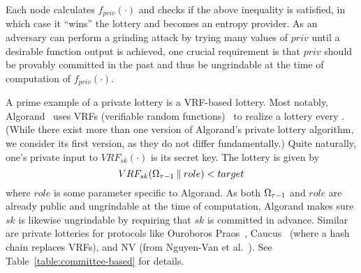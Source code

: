 Each node calculates $f_{priv}(\cdot)$ and checks if the above inequality is satisfied, in which case it ``wins'' the lottery and becomes an entropy provider. As an adversary can perform a grinding attack by trying many values of $priv$ until a desirable function output is achieved, one crucial requirement is that $priv$ should be provably committed in the past and thus be ungrindable at the time of computation of $f_{priv}(\cdot)$.

A prime example of a private lottery is a VRF-based lottery. Most notably, Algorand~\cite{gilad2017algorand} uses VRFs (verifiable random functions)~\cite{micali1999verifiable,dodis2005verifiable} to realize a lottery every \epoch. (While there exist more than one version of Algorand's private lottery algorithm, we consider its first version, as they do not differ fundamentally.) Quite naturally, one's private input to $VRF_{sk}(\cdot)$ is its secret key. The lottery is given by
\[
VRF_{sk}(\Omega_{\tau - 1} \mathbin\Vert role) < target
\]
where $role$ is some parameter specific to Algorand. As both $\Omega_{\tau - 1}$ and $role$ are already public and ungrindable at the time of computation, Algorand makes sure $sk$ is likewise ungrindable by requiring that $sk$ is committed in advance. Similar are private lotteries for protocols like Ouroboros Praos~\cite{david2018ouroboros}, Caucus~\cite{azouvi2018winning} (where a hash chain replaces VRFs), and NV (from Nguyen-Van et al.~\cite{nguyen2019scalable}). See Table~\ref{table:committee-based} for details.


